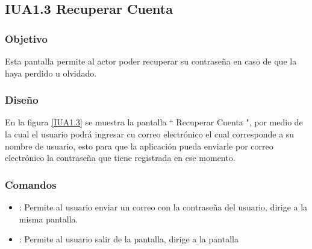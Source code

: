 \subsection{IUA1.3 Recuperar Cuenta}

\subsubsection{Objetivo}

	
    Esta pantalla permite al actor poder recuperar su contraseña en caso de que la haya perdido u olvidado.

\subsubsection{Diseño}


    En la figura \ref{IUA1.3} se muestra la pantalla `` Recuperar Cuenta ", por medio de la cual el usuario podrá ingresar cu correo electrónico el cual corresponde a su nombre de usuario, esto para que la aplicación pueda enviarle por correo electrónico la contraseña que tiene registrada en ese momento.\\
    



\subsubsection{Comandos}
    \begin{itemize}
    	\item {}: Permite al usuario enviar un correo con la contraseña del usuario, dirige a la misma pantalla.
        \item \btnRegresar[Regresar]: Permite al usuario salir de la pantalla, dirige a la pantalla 
    \end{itemize}

